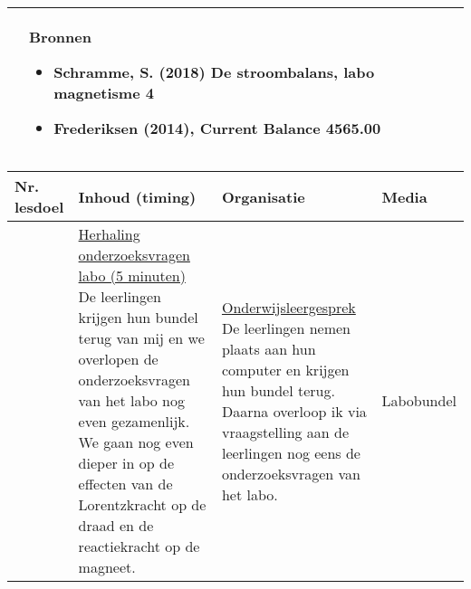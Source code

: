 \begin{landscape}
\begin{tabularx}{1.56\textwidth}{|p{}|X|}
		\\ \cline{2-2}
		  & \textbf{Bronnen}\begin{itemize}
		  	\item Schramme, S. (2018) De stroombalans, labo magnetisme 4
		  	\item Frederiksen (2014), Current Balance 4565.00
		  \end{itemize}\\ \hline
	\end{tabularx}


\newpage
	
	\begin{tabularx}{1.56\textwidth}{|p{1.5cm}|p{9cm}|X|p{4cm}|}
		\hline
		\textbf{Nr. lesdoel } & \textbf{Inhoud (timing)}  & \textbf{Organisatie } & \textbf{Media } \\ \hline
		&\underline{Herhaling onderzoeksvragen} \underline{labo (5 minuten)}\newline
			De leerlingen krijgen hun bundel terug van mij en we overlopen de onderzoeksvragen van het labo nog even gezamenlijk. We gaan nog even dieper in op de effecten van de Lorentzkracht op de draad en de reactiekracht op de magneet.
		&  \underline{Onderwijsleergesprek}\newline 
			De leerlingen nemen plaats aan hun computer en krijgen hun bundel terug. Daarna overloop ik via vraagstelling aan de leerlingen nog eens de onderzoeksvragen van het labo. 
		&  Labobundel
		\\ \hline
	\end{tabularx}\vspace{5mm}


\end{landscape}
